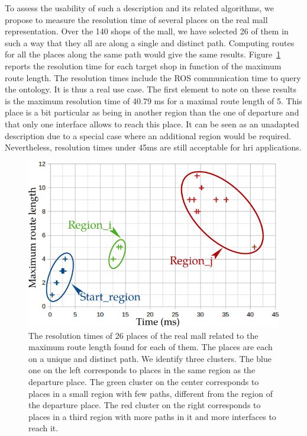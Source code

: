 To assess the usability of such a description and its related algorithms, we propose to measure the resolution time of several places on the real mall representation. Over the 140 shops of the mall, we have selected 26 of them in such a way that they all are along a single and distinct path. Computing routes for all the places along the same path would give the same results. Figure~\ref{fig:chap3_performance} reports the resolution time for each target shop in function of the maximum route length. The resolution times include the ROS communication time to query the ontology. It is thus a real use case. The first element to note on these results is the maximum resolution time of 40.79 ms for a maximal route length of 5. This place is a bit particular as being in another region than the one of departure and that only one interface allows to reach this place. It can be seen as an unadapted description due to a special case where an additional region would be required. Nevertheless, resolution times under 45ms are still acceptable for \acrshort{hri} applications.

\begin{figure}[ht!]
\centering
\includegraphics[scale=0.6]{figures/chapter3/performance.png}
\caption{\label{fig:chap3_performance} The resolution times of 26 places of the real mall related to the maximum route length found for each of them. The places are each on a unique and distinct path. We identify three clusters. The blue one on the left corresponds to places in the same region as the departure place. The green cluster on the center corresponds to places in a small region with few paths, different from the region of the departure place. The red cluster on the right corresponds to places in a third region with more paths in it and more interfaces to reach it. }
\end{figure}

